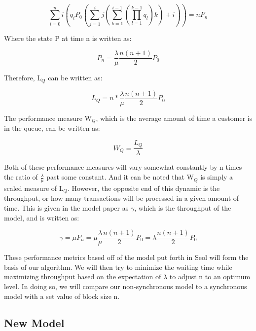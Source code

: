 \documentclass[conference]{IEEEtran}
\begin{document}
\begin{equation}
\sum_{i=0}^ni(q_iP_0(\sum_{j=1}^ij(\sum_{k=1}^{i-1}(\prod_{l=1}^{k-1}q_l)k)+i))=nP_n\label{nPn_eq}
\end{equation}

Where the state P at time n is written as:

\begin{equation}
P_n=\frac{\lambda}{\mu}\frac{n(n+1)}{2}P_0\label{Pn_eq}
\end{equation}

Therefore, L$_Q$ can be written as:

\begin{equation}
L_Q=n\ast\frac{\lambda}{\mu}\frac{n(n+1)}{2}P_0\label{LQ2_eq}
\end{equation}

The performance measure W$_Q$, which is the average amount of time a customer is in the queue, 
can be written as:

\begin{equation}
W_Q=\frac{L_Q}{\lambda}\label{WQ_eq}
\end{equation}

Both of these performance measures will vary somewhat constantly by n times the ratio of 
$\frac{\lambda}{\mu}$ past some constant. And it can be noted that W$_Q$ is simply a scaled 
measure of L$_Q$. However, the opposite end of this dynamic is the throughput, or how many 
transactions will be processed in a given amount of time. This is given in the model paper as 
$\gamma$, which is the throughput of the model, and is written as:

\begin{equation}
\gamma=\mu P_n=\mu\frac{\lambda}{\mu}\frac{n(n+1)}{2}P_0=\lambda\frac{n(n+1)}{2}P_0\label{gamma_eq}
\end{equation}

These performance metrics based off of the model put forth in Seol\cite{2020_ACM_Seol} will form the basis 
of our algorithm. We will then try to minimize the waiting time while maximizing throughput based 
on the expectation of $\lambda$ to adjust n to an optimum level. In doing so, we will compare our 
non-synchronous model to a synchronous model with a set value of block size n. 

\subsection{New Model}\label{new_model}
\end{document}
